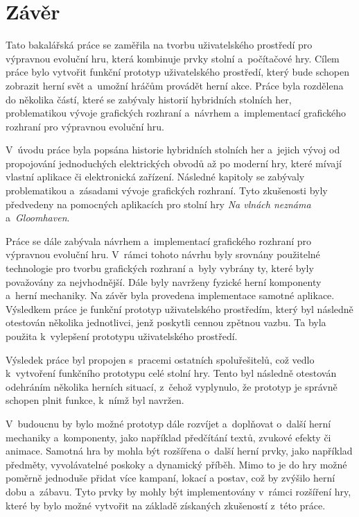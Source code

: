 \chapter{Závěr}
Tato bakalářská práce se zaměřila na tvorbu uživatelského prostředí pro výpravnou evoluční hru, která kombinuje prvky stolní a~počítačové hry. Cílem práce bylo vytvořit funkční prototyp uživatelského prostředí, který bude schopen zobrazit herní svět a~umožní hráčům provádět herní akce. Práce byla rozdělena do několika částí, které se zabývaly historií hybridních stolních her, problematikou vývoje grafických rozhraní a~návrhem a~implementací grafického rozhraní pro výpravnou evoluční hru.

V~úvodu práce byla popsána historie hybridních stolních her a~jejich vývoj od propojování jednoduchých elektrických obvodů až po moderní hry, které mívají vlastní aplikace či elektronická zařízení. Následné kapitoly se zabývaly problematikou a~zásadami vývoje grafických rozhraní. Tyto zkušenosti byly předvedeny na pomocných aplikacích pro stolní hry \textit{Na vlnách neznáma} a~\textit{Gloomhaven}.

Práce se dále zabývala návrhem a~implementací grafického rozhraní pro výpravnou evoluční hru. V~rámci tohoto návrhu byly srovnány použitelné technologie pro tvorbu grafických rozhraní a~byly vybrány ty, které byly považovány za nejvhodnější. Dále byly navrženy fyzické herní komponenty a~herní mechaniky. Na závěr byla provedena implementace samotné aplikace. Výsledkem práce je funkční prototyp uživatelského prostředím, který byl následně otestován několika jednotlivci, jenž poskytli cennou zpětnou vazbu. Ta byla použita k~vylepšení prototypu uživatelského prostředí.

Výsledek práce byl propojen s~pracemi ostatních spoluřešitelů, což vedlo k~vytvoření funkčního prototypu celé stolní hry. Tento byl následně otestován odehráním několika herních situací, z~čehož vyplynulo, že prototyp je správně schopen plnit funkce, k~nímž byl navržen.

V~budoucnu by bylo možné prototyp dále rozvíjet a~doplňovat o~další herní mechaniky a~komponenty, jako například předčítání textů, zvukové efekty či animace. Samotná hra by mohla být rozšířena o~další herní prvky, jako například předměty, vyvolávatelné poskoky a dynamický příběh. Mimo to je do hry možné poměrně jednoduše přidat více kampaní, lokací a postav, což by zvýšilo herní dobu a~zábavu. Tyto prvky by mohly být implementovány v~rámci rozšíření hry, které by bylo možné vytvořit na základě získaných zkušeností z~této práce.